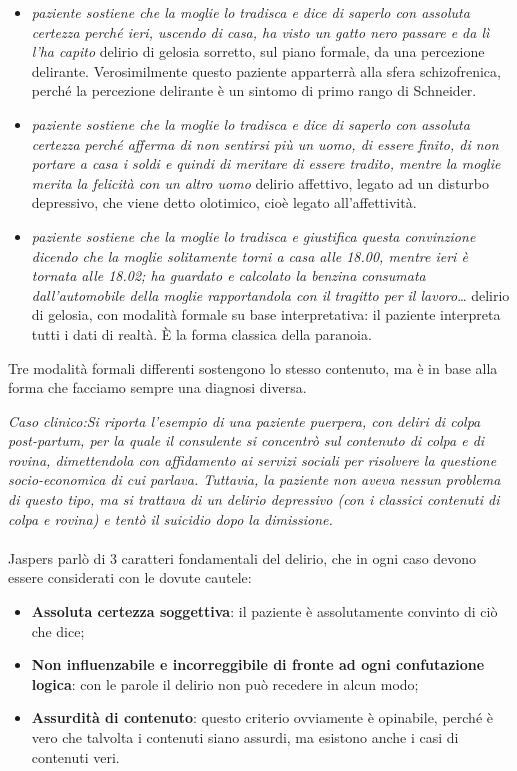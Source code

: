 \begin{itemize}
\begin{itemize}
\item
  \emph{paziente sostiene che la moglie lo tradisca e dice di saperlo
  con assoluta certezza perché ieri, uscendo di casa, ha visto un gatto
  nero passare e da lì l'ha capito} delirio di gelosia sorretto, sul
  piano formale, da una percezione delirante. Verosimilmente questo
  paziente apparterrà alla sfera schizofrenica, perché la percezione
  delirante è un sintomo di primo rango di Schneider.
\item
  \emph{paziente sostiene che la moglie lo tradisca e dice di saperlo
  con assoluta certezza perché afferma di non sentirsi più un uomo, di
  essere finito, di non portare a casa i soldi e quindi di meritare di
  essere tradito, mentre la moglie merita la felicità con un altro uomo}
  delirio affettivo, legato ad un disturbo depressivo, che viene detto
  olotimico, cioè legato all'affettività.
\item
  \emph{paziente sostiene che la moglie lo tradisca e giustifica questa
  convinzione dicendo che la moglie solitamente torni a casa alle 18.00,
  mentre ieri è tornata alle 18.02; ha guardato e calcolato la benzina
  consumata dall'automobile della moglie rapportandola con il tragitto
  per il lavoro}\ldots{} delirio di gelosia, con modalità formale su
  base interpretativa: il paziente interpreta tutti i dati di realtà. È
  la forma classica della paranoia.
\end{itemize}

Tre modalità formali differenti sostengono lo stesso contenuto, ma è in
base alla forma che facciamo sempre una diagnosi diversa.

\emph{Caso clinico:Si riporta l'esempio di una} \emph{paziente puerpera,
con deliri di colpa post-partum, per la quale il consulente si concentrò
sul contenuto di colpa e di rovina, dimettendola con affidamento ai
servizi sociali per risolvere la questione socio-economica di cui
parlava. Tuttavia, la paziente non aveva nessun problema di questo tipo,
ma si trattava di un delirio depressivo (con i classici contenuti di
colpa e rovina) e tentò il suicidio dopo la dimissione. }
\\\\
Jaspers parlò di 3 caratteri fondamentali del delirio, che in ogni caso
devono essere considerati con le dovute cautele:

\begin{itemize}
\item
  \textbf{Assoluta certezza soggettiva}: il paziente è assolutamente
  convinto di ciò che dice;
\item
  \textbf{Non influenzabile e incorreggibile di fronte ad ogni
  confutazione logica}: con le parole il delirio non può recedere in
  alcun modo;
\item
  \textbf{Assurdità di contenuto}: questo criterio ovviamente è
  opinabile, perché è vero che talvolta i contenuti siano assurdi, ma
  esistono anche i casi di contenuti veri.
\end{itemize}


\end{itemize}
